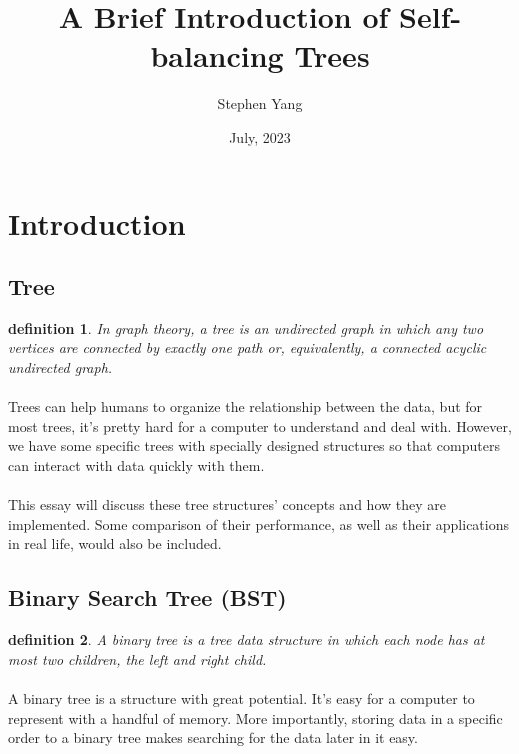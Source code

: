 \documentclass{article}
\newtheorem{definition}{definition}[section]
\begin{document}
\title{A Brief Introduction of Self-balancing Trees}
\author{Stephen Yang}
\date{July, 2023}
\maketitle

\tableofcontents


\newpage
\section{Introduction}

\subsection{Tree}

\begin{definition}
    In graph theory, a tree is an undirected graph in which any two vertices are connected by exactly one path or, equivalently, a connected acyclic undirected graph.
\end{definition}

\paragraph{}
Trees can help humans to organize the relationship between the data, but for most trees, it's pretty hard for a computer to understand and deal with. However, we have some specific trees with specially designed structures so that computers can interact with data quickly with them.

\paragraph{}
This essay will discuss these tree structures' concepts and how they are implemented. Some comparison of their performance, as well as their applications in real life, would also be included.

\subsection{Binary Search Tree (BST)}

\begin{definition}
    A binary tree is a tree data structure in which each node has at most two children, the left and right child.
\end{definition}

\paragraph{}
A binary tree is a structure with great potential. It's easy for a computer to represent with a handful of memory. More importantly, storing data in a specific order to a binary tree makes searching for the data later in it easy.
\end{document}
